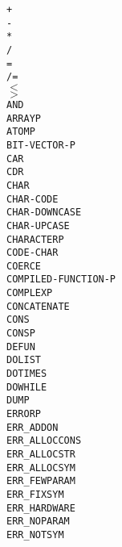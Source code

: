 \documentclass[10pt, openany]{book}
\newcommand{\keyword}[1]{\texttt{#1}}
\begin{document}
\begin{multicols}{4}
  \keyword{+}\\
  \keyword{-}\\
  \keyword{*}\\
  \keyword{/}\\
  \keyword{=}\\
  \keyword{/=}\\
  \keyword{$<$}\\
  \keyword{$>$}\\
  \keyword{AND}\\
  \keyword{ARRAYP}\\
  \keyword{ATOMP}\\
  \keyword{BIT-VECTOR-P}\\
  \keyword{CAR}\\
  \keyword{CDR}\\
  \keyword{CHAR}\\
  \keyword{CHAR-CODE}\\
  \keyword{CHAR-DOWNCASE}\\
  \keyword{CHAR-UPCASE}\\
  \keyword{CHARACTERP}\\
  \keyword{CODE-CHAR}\\
  \keyword{COERCE}\\
  \keyword{COMPILED-FUNCTION-P}\\
  \keyword{COMPLEXP}\\
  \keyword{CONCATENATE}\\
  \keyword{CONS}\\
  \keyword{CONSP}\\
  \keyword{DEFUN}\\
  \keyword{DOLIST}\\
  \keyword{DOTIMES}\\
  \keyword{DOWHILE}\\
  \keyword{DUMP}\\
  \keyword{ERRORP}\\
  \keyword{ERR\_ADDON}\\
  \keyword{ERR\_ALLOCCONS}\\
  \keyword{ERR\_ALLOCSTR}\\
  \keyword{ERR\_ALLOCSYM}\\
  \keyword{ERR\_FEWPARAM}\\
  \keyword{ERR\_FIXSYM}\\
  \keyword{ERR\_HARDWARE}\\
  \keyword{ERR\_NOPARAM}\\
  \keyword{ERR\_NOTSYM}\\

\end{multicols}
\end{document}
